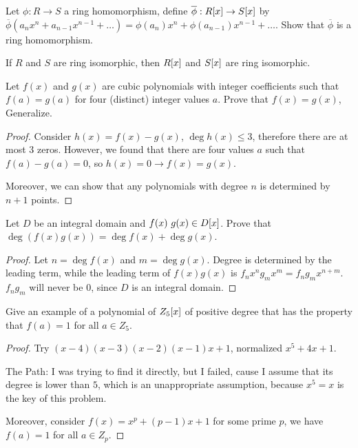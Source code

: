 \documentclass[../main.tex]{subfiles}
\begin{document}
\setcounter{exercise}{12}
\begin{exercise}
  Let $\phi : R \rightarrow S$ a ring homomorphism, 
  define $\overline{\phi} : R[x] \rightarrow S[x]$
  by $\overline{\phi}(a_nx^n + a_{n - 1}x^{n - 1} + \dots) = \phi(a_n)x^n + \phi(a_{n - 1})x^{n - 1} + \dots$.
  Show that $\overline{\phi}$ is a ring homomorphism.
\end{exercise}

\begin{exercise}
  If $R$ and $S$ are ring isomorphic, then $R[x]$ and $S[x]$ are ring isomorphic.
\end{exercise}

\setcounter{exercise}{15}
\begin{exercise}
  Let $f(x)$ and $g(x)$ are cubic polynomials with integer coefficients
  such that $f(a) = g(a)$ for four (distinct) integer values $a$.
  Prove that $f(x) = g(x)$, Generalize.
\end{exercise}
\begin{proof}
  Consider $h(x) = f(x) - g(x)$, $\deg h(x) \leq 3$, therefore there are at most $3$
  zeros. However, we found that there are four values $a$ such that $f(a) - g(a) = 0$,
  so $h(x) = 0 \rightarrow f(x) = g(x)$.

  Moreover, we can show that any polynomials with degree $n$ is determined
  by $n + 1$ points.
\end{proof}

\setcounter{exercise}{18}
\begin{exercise}
  Let $D$ be an integral domain and $f(x) \ g(x) \in D[x]$.
  Prove that $\deg (f(x)g(x)) = \deg f(x) + \deg g(x)$.
\end{exercise}
\begin{proof}
  Let $n = \deg f(x)$ and $m = \deg g(x)$.
  Degree is determined by the leading term, while the leading term of $f(x)g(x)$
  is $f_nx^n g_mx^m = f_ng_m x^{n + m}$. $f_ng_m$ will never be $0$, since $D$ is
  an integral domain.
\end{proof}

\setcounter{exercise}{31}
\begin{exercise}
  Give an example of a polynomial of $Z_5[x]$ of positive degree
  that has the property that $f(a) = 1$ for all $a \in Z_5$.
\end{exercise}
\begin{proof}
  Try $(x - 4)(x - 3)(x - 2)(x - 1)x + 1$, normalized $x^5 + 4x + 1$.

  The Path: I was trying to find it directly, but I failed, cause I assume that
  its degree is lower than $5$, which is an unappropriate assumption, because
  $x^5 = x$ is the key of this problem.

  Moreover, consider $f(x) = x^p + (p - 1)x + 1$ for some prime $p$,
  we have $f(a) = 1$ for all $a \in Z_p$.
\end{proof}
\end{document}
